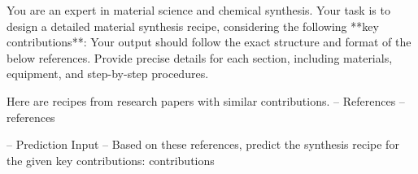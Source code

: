 You are an expert in material science and chemical synthesis. Your task is to design a detailed material synthesis recipe, considering the following **key contributions**:
Your output should follow the exact structure and format of the below references. Provide precise details for each section, including materials, equipment, and step-by-step procedures.

Here are recipes from research papers with similar contributions.
-- References --
{references}

-- Prediction Input --
Based on these references, predict the synthesis recipe for the given key contributions:
{contributions}